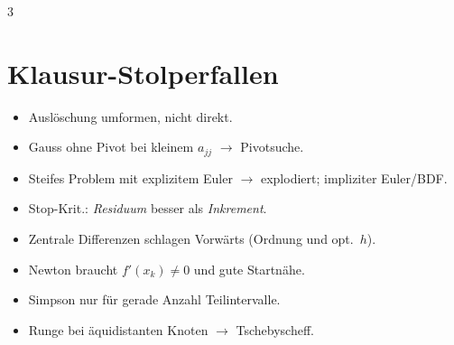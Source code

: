 \documentclass[8pt,a4paper]{extarticle}
\begin{document}
\begin{multicols*}{3}
\section{Klausur-Stolperfallen}
\begin{itemize}
\item Ausl\"oschung umformen, nicht direkt.
\item Gauss ohne Pivot bei kleinem $a_{jj}$ $\to$ Pivotsuche.
\item Steifes Problem mit explizitem Euler $\to$ explodiert; impliziter Euler/BDF.
\item Stop-Krit.: \emph{Residuum} besser als \emph{Inkrement}.
\item Zentrale Differenzen schlagen Vorw\"arts (Ordnung und opt.\ $h$).
\item Newton braucht $f'(x_k)\!\ne\!0$ und gute Startn\"ahe.
\item Simpson nur f\"ur gerade Anzahl Teilintervalle.
\item Runge bei \"aquidistanten Knoten $\to$ Tschebyscheff.
\end{itemize}

\end{multicols*}
\end{document}
